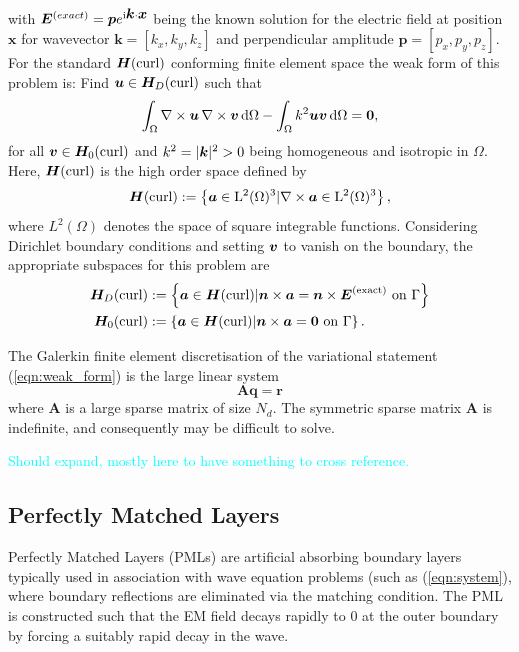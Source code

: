 \documentclass[a4paper,12]{elsarticle}
\theoremstyle{definition}
\renewcommand{\vec}[1]{\mbox{\boldmath$#1$}}
\newcommand{\curl}{\nabla \times}
\begin{document}
with $\boldsymbol{E}^{(exact)} = \vec{p}e^{\rm{i} \vec{k} \cdot \vec{x}}$ being the known solution for the electric field at position $\boldsymbol{x}$ for wavevector $\boldsymbol{k} = \left[k_x, k_y, k_z\right]$ and perpendicular amplitude $\boldsymbol{p} = \left[p_x, p_y, p_z\right]$. For the standard $\boldsymbol{H}(\rm{curl})$ conforming finite element space \cite{Monk2017} the weak form of this problem is: Find $\boldsymbol{u} \in \boldsymbol{H}_D(\rm{curl})$ such that
\begin{equation}\label{eqn:weak_form}
\int_\Omega \curl \vec{u} \, \curl \vec{v} \,\mathrm{d}\Omega - \int_\Omega k^2 \vec{u}\vec{v} \,\mathrm{d}\Omega = \vec{0},
\end{equation}
for all $\vec{v} \in \boldsymbol{H}_0(\rm{curl})$ and $k^2 = |\vec{k}|^2 > 0$ being homogeneous and isotropic in $\Omega$. Here, $\boldsymbol{H}(\rm{curl})$ is the high order space defined by
\begin{equation*}
\boldsymbol{H}(\rm{curl}) := \left\{ \vec{a} \in L^2(\Omega)^3 | \curl \vec{a} \in L^2(\Omega)^3\right\},
\end{equation*}
where $L^2(\Omega)$ denotes the space of square integrable functions. Considering Dirichlet boundary conditions and setting $\vec{v}$ to vanish on the boundary, the appropriate subspaces for this problem are
\begin{equation*}
\begin{alignedat}{2}
\boldsymbol{H}_D(\rm{curl}) &:= \left\{ \vec{a} \in \vec{H}(\rm{curl}) | \vec{n}\times \vec{a} = \vec{n} \times \vec{E}^{(exact)} \text{ on } \Gamma\right\}\\
\boldsymbol{H}_0(\rm{curl}) &:= \left\{ \vec{a} \in \vec{H}(\rm{curl}) | \vec{n}\times \vec{a} = \vec{0} \text{ on } \Gamma\right\}.
\end{alignedat}
\end{equation*}

The Galerkin finite element discretisation of the variational statement (\ref{eqn:weak_form}) is the large linear system
\begin{equation}\label{eqn:lse}
\mathbf{A}\mathbf{q} = \mathbf{r}
\end{equation}
where $\mathbf{A}$ is a large sparse matrix of size $N_d$. The symmetric sparse matrix $\mathbf{A}$ is indefinite, and consequently may be difficult to solve.

\textcolor{cyan}{Should expand, mostly here to have something to cross reference.}


\subsection{Perfectly Matched Layers}
Perfectly Matched Layers (PMLs) are artificial absorbing boundary layers typically used in association with wave equation problems (such as (\ref{eqn:system}), where boundary reflections are eliminated via the matching condition. The PML is constructed such that the EM field decays rapidly to 0 at the outer boundary by forcing a suitably rapid decay in the wave.
\end{document}
